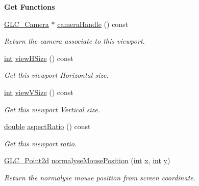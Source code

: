 \begin{Indent}{\bf Get Functions}\par
\begin{DoxyCompactItemize}
\item 
\hyperlink{class_g_l_c___camera}{G\-L\-C\-\_\-\-Camera} $\ast$ \hyperlink{class_g_l_c___viewport_a2356b1a70b98cb96de312a186e50b8d8}{camera\-Handle} () const 
\begin{DoxyCompactList}\small\item\em Return the camera associate to this viewport. \end{DoxyCompactList}\item 
\hyperlink{ioapi_8h_a787fa3cf048117ba7123753c1e74fcd6}{int} \hyperlink{class_g_l_c___viewport_a45ffbab640ea235880d7e5af61e20832}{view\-H\-Size} () const 
\begin{DoxyCompactList}\small\item\em Get this viewport Horizontal size. \end{DoxyCompactList}\item 
\hyperlink{ioapi_8h_a787fa3cf048117ba7123753c1e74fcd6}{int} \hyperlink{class_g_l_c___viewport_a0c08c38e06949f4d515e3ed9c23534f6}{view\-V\-Size} () const 
\begin{DoxyCompactList}\small\item\em Get this viewport Vertical size. \end{DoxyCompactList}\item 
\hyperlink{_super_l_u_support_8h_a8956b2b9f49bf918deed98379d159ca7}{double} \hyperlink{class_g_l_c___viewport_aaf2bc1afb004dc3e31d083f930de7a38}{aspect\-Ratio} () const 
\begin{DoxyCompactList}\small\item\em Get this viewport ratio. \end{DoxyCompactList}\item 
\hyperlink{glc__vector2d_8h_aa2ff653e68023d8ac19c421c53fd764a}{G\-L\-C\-\_\-\-Point2d} \hyperlink{class_g_l_c___viewport_ae0684ad91a7f9afe8ef88d64b7ee87d4}{normalyse\-Mouse\-Position} (\hyperlink{ioapi_8h_a787fa3cf048117ba7123753c1e74fcd6}{int} \hyperlink{glext_8h_a1db9d104e3c2128177f26aff7b46982f}{x}, \hyperlink{ioapi_8h_a787fa3cf048117ba7123753c1e74fcd6}{int} \hyperlink{glext_8h_a42315f3ed8fff752bb47fd782309fcfc}{y})
\begin{DoxyCompactList}\small\item\em Return the normalyse mouse position from screen coordinate. \end{DoxyCompactList}\item 

\end{DoxyCompactItemize}
\end{Indent}
